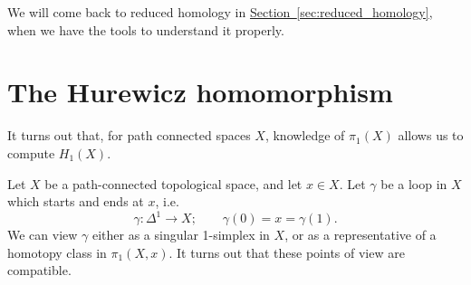 \documentclass[main.tex]{subfiles}
\begin{document}
We will come back to reduced homology in \hyperref[sec:reduced_homology]{Section~\ref*{sec:reduced_homology}}, when we have the tools to understand it properly.

\section{The Hurewicz homomorphism}
\label{sec:the_hurewicz_homomorphism}

It turns out that, for path connected spaces \(X\), knowledge of \(\pi_{1}(X)\) allows us to compute \(H_{1}(X)\).

Let $X$ be a path-connected topological space, and let $x \in X$. Let $\gamma$ be a loop in $X$ which starts and ends at $x$, i.e.\
\begin{equation*}
  \gamma\colon \Delta^{1} \to X;\qquad \gamma(0) = x = \gamma(1).
\end{equation*}
We can view $\gamma$ either as a singular 1-simplex in $X$, or as a representative of a homotopy class in $\pi_{1}(X, x)$. It turns out that these points of view are compatible.
\end{document}
